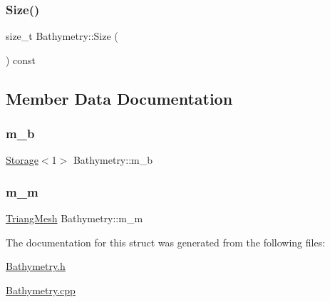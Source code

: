 \subsubsection{\texorpdfstring{Size()}{Size()}}
{\footnotesize\ttfamily size\+\_\+t Bathymetry\+::\+Size (\begin{DoxyParamCaption}{ }\end{DoxyParamCaption}) const\hspace{0.3cm}{\ttfamily [inline]}}



\subsection{Member Data Documentation}
\mbox{\label{structBathymetry_a5478b5454f3b9a280b903ac64b7f8a7b}} 
\subsubsection{\texorpdfstring{m\+\_\+b}{m\_b}}
{\footnotesize\ttfamily \hyperlink{Includes_8h_ae7d375db701e28425a3faea2827f134b}{Storage}$<$1$>$ Bathymetry\+::m\+\_\+b\hspace{0.3cm}{\ttfamily [private]}}

\mbox{\label{structBathymetry_a5e00d3f71e39a4f82f5228bf006d0f02}} 
\subsubsection{\texorpdfstring{m\+\_\+m}{m\_m}}
{\footnotesize\ttfamily \hyperlink{structTriangMesh}{Triang\+Mesh} Bathymetry\+::m\+\_\+m\hspace{0.3cm}{\ttfamily [private]}}



The documentation for this struct was generated from the following files\+:\begin{DoxyCompactItemize}
\item 
\hyperlink{Bathymetry_8h}{Bathymetry.\+h}\item 
\hyperlink{Bathymetry_8cpp}{Bathymetry.\+cpp}\end{DoxyCompactItemize}
